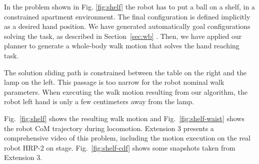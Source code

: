 \documentclass{article}
\begin{document}
In the problem shown in Fig. \ref{fig:shelf} the robot has to put a ball on a
shelf, in a constrained apartment environment. The final configuration is defined 
implicitly as a desired hand position. We have generated automatically goal configurations 
solving the task, as described in Section~\ref{sec:wb} . Then, we have
applied our planner to generate a whole-body walk motion that solves the hand reaching
task. 

The solution sliding path is constrained between the table on the right and the lamp
on the left. This passage is too narrow for the robot nominal walk parameters. 
When executing the walk motion resulting from our algorithm, the robot left hand
is only a few centimeters away from the lamp.

Fig.~\ref{fig:shelf} shows the resulting walk motion and Fig.~\ref{fig:shelf-waist} 
shows the robot CoM trajectory during locomotion. Extension 3 presents a 
comprehensive video of this problem, including the motion execution on
the real robot HRP-2 on stage. Fig.~\ref{fig:shelf-cdf} shows some snapshots 
taken from Extension 3.
\end{document}
